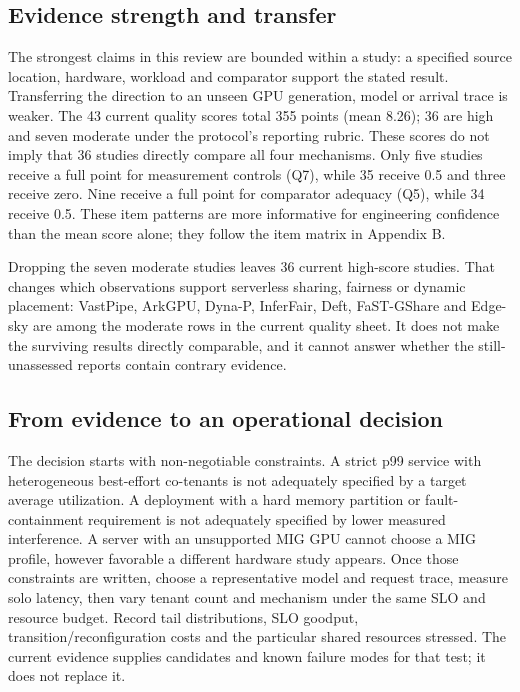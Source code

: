 \subsection{Evidence strength and transfer}
The strongest claims in this review are bounded within a study: a specified source location, hardware, workload and comparator support the stated result. Transferring the direction to an unseen GPU generation, model or arrival trace is weaker. The 43 current quality scores total 355 points (mean 8.26); 36 are high and seven moderate under the protocol's reporting rubric. These scores do not imply that 36 studies directly compare all four mechanisms. Only five studies receive a full point for measurement controls (Q7), while 35 receive 0.5 and three receive zero. Nine receive a full point for comparator adequacy (Q5), while 34 receive 0.5. These item patterns are more informative for engineering confidence than the mean score alone; they follow the item matrix in Appendix B.

Dropping the seven moderate studies leaves 36 current high-score studies. That changes which observations support serverless sharing, fairness or dynamic placement: VastPipe, ArkGPU, Dyna-P, InferFair, Deft, FaST-GShare and Edge-sky are among the moderate rows in the current quality sheet. It does not make the surviving results directly comparable, and it cannot answer whether the still-unassessed reports contain contrary evidence. 

\subsection{From evidence to an operational decision}
The decision starts with non-negotiable constraints. A strict p99 service with heterogeneous best-effort co-tenants is not adequately specified by a target average utilization. A deployment with a hard memory partition or fault-containment requirement is not adequately specified by lower measured interference. A server with an unsupported MIG GPU cannot choose a MIG profile, however favorable a different hardware study appears. Once those constraints are written, choose a representative model and request trace, measure solo latency, then vary tenant count and mechanism under the same SLO and resource budget. Record tail distributions, SLO goodput, transition/reconfiguration costs and the particular shared resources stressed. The current evidence supplies candidates and known failure modes for that test; it does not replace it.

